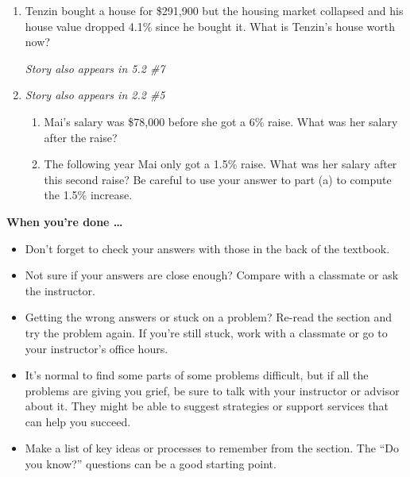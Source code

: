 \begin{enumerate}
\item Tenzin bought a house for \$291,900 but the housing market collapsed and his house value dropped 4.1\% since he bought it.  What is Tenzin's house worth now?

 \hfill \emph{Story also appears in 5.2 \#7}

\item \emph{Story also appears in 2.2 \#5}
 \begin{enumerate}
\item Mai's salary was \$78,000 before she got a 6\% raise. What was her salary after the raise?
\item The following year Mai only got a 1.5\% raise.  What was her salary after this second raise?  Be careful to use your answer to part (a) to compute the 1.5\% increase.
\end{enumerate}

\end{enumerate}

\bigskip
\newpage

\noindent \textbf{When you're done \ldots}

\begin{itemize}
\item Don't forget to check your answers with those in the back of the textbook. 
\item Not sure if your answers are close enough? Compare with a classmate or ask the instructor.  
\item Getting the wrong answers or stuck on a problem?  Re-read the section and try the problem again.   If you're still stuck, work with a classmate or go to your instructor's office hours.
\item It's normal to find some parts of some problems difficult, but if all the problems are giving you grief, be sure to talk with your instructor or advisor about it.  They might be able to suggest strategies or support services that can help you succeed.
\item Make a list of key ideas or processes to remember from the section.  The ``Do you know?'' questions can be a good starting point.
\end{itemize}

